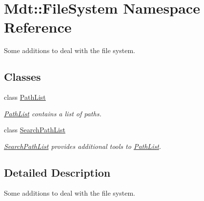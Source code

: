 \hypertarget{namespace_mdt_1_1_file_system}{}\section{Mdt\+:\+:File\+System Namespace Reference}
\label{namespace_mdt_1_1_file_system}


Some additions to deal with the file system.  


\subsection*{Classes}
\begin{DoxyCompactItemize}
\item 
class \hyperlink{class_mdt_1_1_file_system_1_1_path_list}{Path\+List}
\begin{DoxyCompactList}\small\item\em \hyperlink{class_mdt_1_1_file_system_1_1_path_list}{Path\+List} contains a list of paths. \end{DoxyCompactList}\item 
class \hyperlink{class_mdt_1_1_file_system_1_1_search_path_list}{Search\+Path\+List}
\begin{DoxyCompactList}\small\item\em \hyperlink{class_mdt_1_1_file_system_1_1_search_path_list}{Search\+Path\+List} provides additional tools to \hyperlink{class_mdt_1_1_file_system_1_1_path_list}{Path\+List}. \end{DoxyCompactList}\end{DoxyCompactItemize}


\subsection{Detailed Description}
Some additions to deal with the file system. 